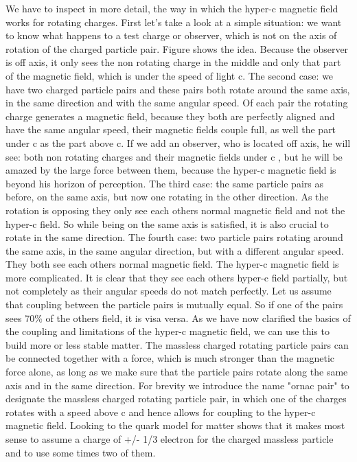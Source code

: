 We have to inspect in more detail, the way in which the hyper-c magnetic field works for rotating charges. First let's take a look at a simple situation: we want to know what happens to a test charge or observer, which is not on the axis of rotation of the charged particle pair. Figure shows the idea. Because the observer is off axis, it only sees the non rotating charge in the middle and only that part of the magnetic field, which is under the speed of light c. The second case: we have two charged particle pairs and these pairs both rotate around the same axis, in the same direction and with the same angular speed. Of each pair the rotating charge generates a magnetic field, because they both are perfectly aligned and have the same angular speed, their magnetic fields couple full, as well the part under c as the part above c. If we add an observer, who is located off axis, he will see: both non rotating charges and their magnetic fields under c , but he will be amazed by the large force between them, because the hyper-c magnetic field is beyond his horizon of perception. The third case: the same particle pairs as before, on the same axis, but now one rotating in the other direction. As the rotation is opposing they only see each others normal magnetic field and not the hyper-c field. So while being on the same axis is satisfied, it is also crucial to rotate in the same direction. The fourth case: two particle pairs rotating around the same axis, in the same angular direction, but with a different angular speed.  They both see each others normal magnetic field. The hyper-c magnetic field is more complicated. It is clear that they see each others hyper-c field partially, but not completely as their angular speeds do not match perfectly. Let us assume that coupling between the particle pairs is mutually equal. So if one of the pairs sees 70\% of the others field, it is visa versa.
As we have now clarified the basics of the coupling and limitations of the hyper-c magnetic field, we can use this to build more or less stable matter. The massless charged rotating particle pairs can be connected together with a force, which is much stronger than the magnetic force alone, as long as we make sure that the particle pairs rotate along the same axis and in the same direction. For brevity we introduce the name "ornac pair" to designate the massless charged rotating particle pair, in which one of the charges rotates with a speed above c and hence allows for coupling to the hyper-c magnetic field. Looking to the quark model for matter shows that it makes most sense to assume a charge of +/- 1/3 electron for the charged massless particle and to use some times two of them.















